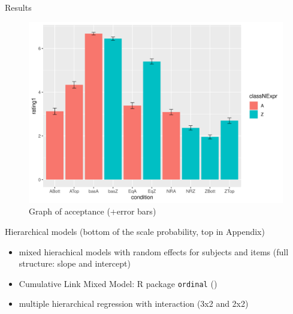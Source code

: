 \documentclass[
  ignorenonframetext,
]{beamer}
\providecommand{\tightlist}{%
  \setlength{\itemsep}{0pt}\setlength{\parskip}{0pt}}
\begin{document}
\begin{frame}
\begin{block}{Results}
\protect\hypertarget{results}{}
\begin{figure}
\centering
\includegraphics{"error_bar.png"}
\caption{Graph of acceptance (+error bars)}
\end{figure}
\end{block}
\end{frame}

\begin{frame}
\begin{block}{Hierarchical models}
\protect\hypertarget{hierarchical-models}{}
(bottom of the scale probability, top in Appendix)

\begin{itemize}
\tightlist
\item
  mixed hierachical models with random effects for subjects and items
  (full structure: slope and intercept)
\item
  Cumulative Link Mixed Model: R package \texttt{ordinal}
  (\citet{r-ordinal})
\item
  multiple hierarchical regression with interaction (3x2 and 2x2)
\end{itemize}
\end{block}
\end{frame}
\end{document}
